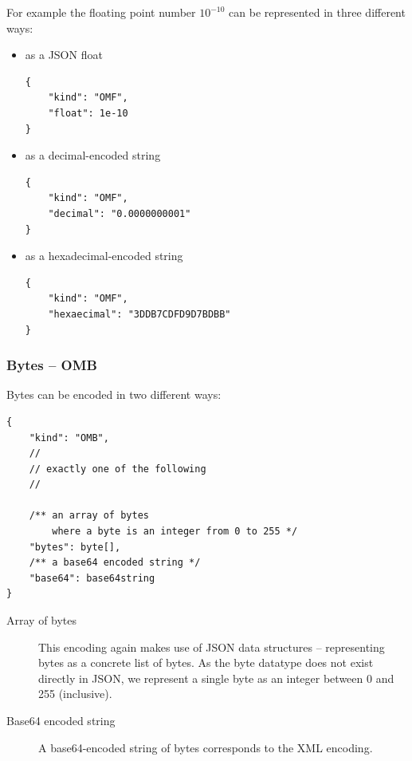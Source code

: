 For example the floating point number $10^{-10}$ can be represented in three different ways:
\begin{itemize}
    \item as a JSON float
\\\begin{minipage}{\linewidth}\begin{lstlisting}
{
    "kind": "OMF",
    "float": 1e-10
}
\end{lstlisting}\end{minipage}
    \item as a decimal-encoded string
\\\begin{minipage}{\linewidth}\begin{lstlisting}
{
    "kind": "OMF",
    "decimal": "0.0000000001"
}
\end{lstlisting}\end{minipage}
    \item as a hexadecimal-encoded string
\\\begin{minipage}{\linewidth}\begin{lstlisting}
{
    "kind": "OMF",
    "hexaecimal": "3DDB7CDFD9D7BDBB"
}
\end{lstlisting}\end{minipage}
\end{itemize}

\subsubsection{Bytes -- OMB}

Bytes can be encoded in two different ways:
\\\begin{minipage}{\linewidth}\begin{lstlisting}
{
    "kind": "OMB",
    //
    // exactly one of the following
    //

    /** an array of bytes
        where a byte is an integer from 0 to 255 */
    "bytes": byte[],
    /** a base64 encoded string */
    "base64": base64string
}
\end{lstlisting}\end{minipage}

\begin{description}
    \item[Array of bytes]
    This encoding again makes use of JSON data structures -- representing bytes as a concrete list of bytes.
    As the byte datatype does not exist directly in JSON, we represent a single byte as an integer between 0 and 255 (inclusive). 

    \item[Base64 encoded string]
    A base64-encoded string of bytes corresponds to the XML encoding. 
\end{description}

